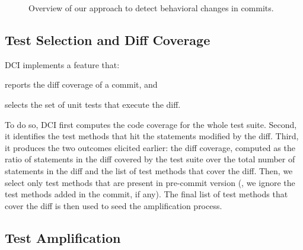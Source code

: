 \begin{figure}
    \caption{Overview of our approach to detect behavioral changes in commits.}
    \label{fig:global_approach}
\end{figure}

\subsection{Test Selection and Diff Coverage}
\label{subsec:compute_diff_coverage}

DCI implements a feature that:
\begin{enumerate*}
\item reports the diff coverage of a commit, and
\item selects the set of unit tests that execute the diff.
\end{enumerate*}
%
To do so, DCI first computes the code coverage for the whole test suite.
Second, it identifies the test methods that hit the statements modified by the diff. 
Third, it produces the two outcomes elicited earlier: the diff coverage, computed as the ratio of statements in the diff covered by the test suite over the total number of statements in the diff and the list of test methods that cover the diff.
%
Then, we select only test methods that are present in pre-commit version (\ie, we ignore the test methods added in the commit, if any).
The final list of test methods that cover the diff is then used to seed the amplification process.

\subsection{Test Amplification}

